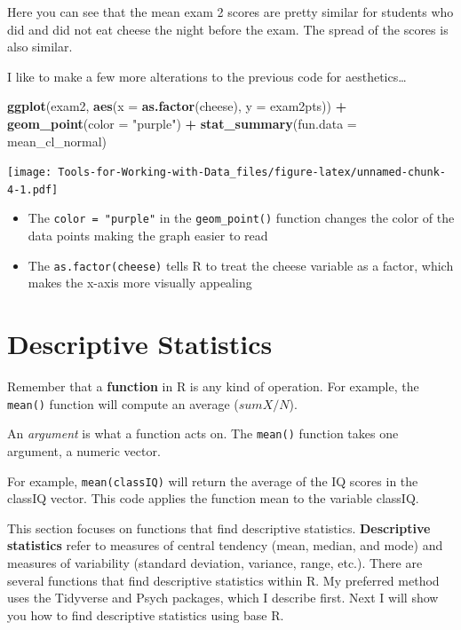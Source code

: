 \documentclass[
]{book}
\newenvironment{Shaded}{\begin{snugshade}}{\end{snugshade}}
\newcommand{\DataTypeTok}[1]{\textcolor[rgb]{0.13,0.29,0.53}{#1}}
\newcommand{\KeywordTok}[1]{\textcolor[rgb]{0.13,0.29,0.53}{\textbf{#1}}}
\newcommand{\NormalTok}[1]{#1}
\newcommand{\OperatorTok}[1]{\textcolor[rgb]{0.81,0.36,0.00}{\textbf{#1}}}
\newcommand{\StringTok}[1]{\textcolor[rgb]{0.31,0.60,0.02}{#1}}
\providecommand{\tightlist}{%
  \setlength{\itemsep}{0pt}\setlength{\parskip}{0pt}}
\begin{document}
Here you can see that the mean exam 2 scores are pretty similar for students who did and did not eat cheese the night before the exam. The spread of the scores is also similar.

I like to make a few more alterations to the previous code for aesthetics\ldots{}

\begin{Shaded}
\begin{Highlighting}[]
\KeywordTok{ggplot}\NormalTok{(exam2, }\KeywordTok{aes}\NormalTok{(}\DataTypeTok{x =} \KeywordTok{as.factor}\NormalTok{(cheese), }\DataTypeTok{y =}\NormalTok{ exam2pts)) }\OperatorTok{+}
\StringTok{  }\KeywordTok{geom_point}\NormalTok{(}\DataTypeTok{color =} \StringTok{"purple"}\NormalTok{) }\OperatorTok{+}
\StringTok{  }\KeywordTok{stat_summary}\NormalTok{(}\DataTypeTok{fun.data =}\NormalTok{ mean_cl_normal)}
\end{Highlighting}
\end{Shaded}

\texttt{[image: Tools-for-Working-with-Data\_files/figure-latex/unnamed-chunk-4-1.pdf]}

\begin{itemize}
\tightlist
\item
  The \texttt{color\ =\ "purple"} in the \texttt{geom\_point()} function changes the color of the data points making the graph easier to read\\
\item
  The \texttt{as.factor(cheese)} tells R to treat the cheese variable as a factor, which makes the x-axis more visually appealing
\end{itemize}

\hypertarget{descriptive-statistics}{%
\chapter{Descriptive Statistics}\label{descriptive-statistics}}

Remember that a \textbf{function} in R is any kind of operation. For example, the \texttt{mean()} function will compute an average (\(sumX/N\)).

An \emph{argument} is what a function acts on. The \texttt{mean()} function takes one argument, a numeric vector.

For example, \texttt{mean(classIQ)} will return the average of the IQ scores in the classIQ vector. This code applies the function mean to the variable classIQ.

This section focuses on functions that find descriptive statistics. \textbf{Descriptive statistics} refer to measures of central tendency (mean, median, and mode) and measures of variability (standard deviation, variance, range, etc.). There are several functions that find descriptive statistics within R. My preferred method uses the Tidyverse and Psych packages, which I describe first. Next I will show you how to find descriptive statistics using base R.
\end{document}
